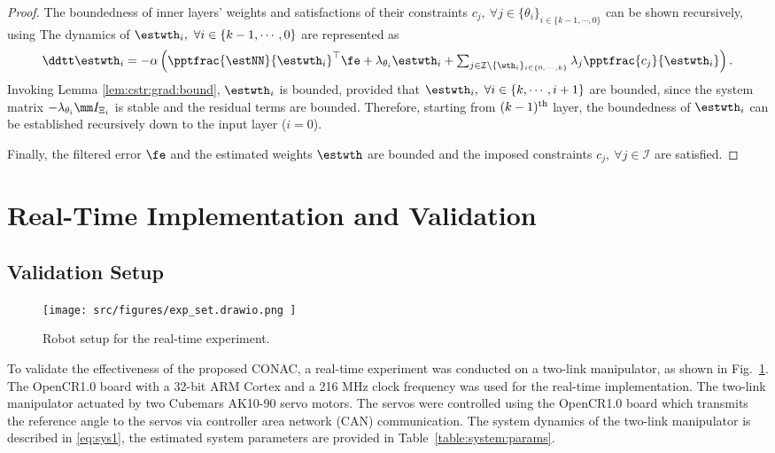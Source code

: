 \documentclass[lettersize,journal]{IEEEtran}
\begin{document}
\begin{proof}
The boundedness of inner layers' weights and satisfactions of their constraints $c_j,\ \forall j\in\{\theta_i\}_{i\in\{k-1,\cdots,0\}}$ can be shown recursively, using \cite[Chap.~4 T.~1.9]{Desoer:2009aa}
The dynamics of $\estwth_i,\ \forall i\in\{k-1,\cdots,0\}$ are represented as
\begin{equation}
    \ddtt \estwth_i 
    =
    -\alpha
    \left(
        \pptfrac{\estNN}{\estwth_i}^\top
        \fe
        +
        \lambda_{\theta_i}\estwth_i
        +
        \textstyle\sum_{
            j\in\mathcal{I}\setminus \{\wth_i\}_{i\in\{0,\cdots,k\}}
        }
        \lambda_j
        \pptfrac{c_j}{\estwth_i}
    \right)
    .
\end{equation}
Invoking Lemma \ref{lem:cstr:grad:bound}, $\estwth_i$ is bounded, provided that $\estwth_i,\ \forall i\in\{k,\cdots,i+1\}$ are bounded, since the system matrix $-\lambda_{\theta_i} \mm I_{\Xi_i}$ is stable and the residual terms are bounded.
Therefore, starting from $(k-1)\textsuperscript{th}$ layer, the boundedness of $\estwth_i$ can be established recursively down to the input layer ($i=0$).

\hfill

Finally, the filtered error $\fe$ and the estimated weights $\estwth$ are bounded and the imposed constraints $c_j,\ \forall j\in\mathcal I$ are satisfied.

\end{proof}

\section{Real-Time Implementation and Validation}\label{sec:sim}

\subsection{Validation Setup}

\begin{figure}[t]
    \centering
        \texttt{[image: 
            src/figures/exp\_set.drawio.png
        ]}%
    \caption{
        Robot setup for the real-time experiment.
    }
    \label{fig:ctrl:exp:set}
\end{figure}

To validate the effectiveness of the proposed CONAC, a real-time experiment was conducted on a two-link manipulator, as shown in Fig.~\ref{fig:ctrl:exp:set}. 
The OpenCR1.0 board \cite{opencr} with a 32-bit ARM Cortex and a 216 MHz clock frequency was used for the real-time implementation.
The two-link manipulator actuated by two Cubemars AK10-90 servo motors. 
The servos were controlled using the OpenCR1.0 board which transmits the reference angle to the servos via controller area network (CAN) communication.
The system dynamics of the two-link manipulator is described in \eqref{eq:sys1}, the estimated system parameters are provided in Table~\ref{table:system:params}. 
\end{document}
